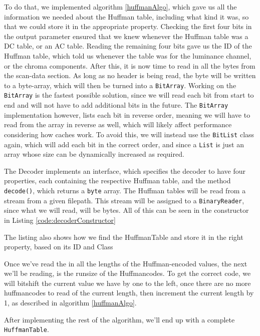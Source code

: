 To do that, we implemented algorithm \ref{huffmanAlgo}, which gave us all the information we needed about the Huffman table, including what kind it was, so that we could store it in the appropriate property. 
Checking the first four bits in the output parameter ensured that we knew whenever the Huffman table was a DC table, or an AC table. 
Reading the remaining four bits gave us the ID of the Huffman table, which told us whenever the table was for the luminance channel, or the chroma components.
After this, it is now time to read in all the bytes from the scan-data section. As long as no header is being read, the byte will be written to a byte-array, which will then be turned into a \lstinline|BitArray|.
Working on the \lstinline|BitArray| is the fastest possible solution, since we will read each bit from start to end and will not have to add additional bits in the future. The \lstinline|BitArray| implementation however, lists each bit in reverse order, meaning we will have to read from the array in reverse as well, which will likely affect performance considering how caches work.
To avoid this, we will instead use the \lstinline|BitList| class again, which will add each bit in the correct order, and since a \lstinline|List| is just an array whose size can be dynamically increased as required. 

The Decoder implements an interface, which specifies the decoder to have four properties, each containing the respective Huffman table, and the method \lstinline|decode()|, which returns a \lstinline|byte| array. 
The Huffman tables will be read from a stream from a given filepath. This stream will be assigned to a \lstinline|BinaryReader|, since what we will read, will be bytes. All of this can be seen in the constructor in Listing \ref{code:decoderConstructor}
 

The listing also shows how we find the HuffmanTable and store it in the right property, based on its ID and Class

Once we've read the in all the lengths of the Huffman-encoded values, the next we'll be reading, is the runsize of the Huffmancodes. To get the correct code, we will bitshift the current value we have by one to the left, once there are no more huffmancodes to read of the current length, then increment the current length by 1, as described in algorithm \ref{huffmanAlgo}.

After implementing the rest of the algorithm, we'll end up with a complete \lstinline|HuffmanTable|.
